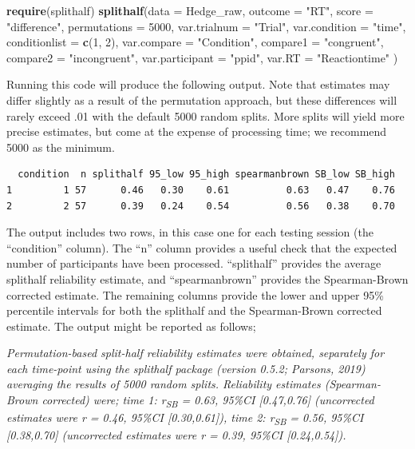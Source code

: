 \documentclass[english,,man,floatsintext]{apa6}
\newenvironment{Shaded}{\begin{snugshade}}{\end{snugshade}}
\newcommand{\DataTypeTok}[1]{\textcolor[rgb]{0.13,0.29,0.53}{#1}}
\newcommand{\DecValTok}[1]{\textcolor[rgb]{0.00,0.00,0.81}{#1}}
\newcommand{\KeywordTok}[1]{\textcolor[rgb]{0.13,0.29,0.53}{\textbf{#1}}}
\newcommand{\NormalTok}[1]{#1}
\newcommand{\StringTok}[1]{\textcolor[rgb]{0.31,0.60,0.02}{#1}}
\begin{document}
\begin{Shaded}
\begin{Highlighting}[]
\KeywordTok{require}\NormalTok{(splithalf)}
\KeywordTok{splithalf}\NormalTok{(}\DataTypeTok{data =}\NormalTok{ Hedge_raw,}
          \DataTypeTok{outcome =} \StringTok{"RT"}\NormalTok{,}
          \DataTypeTok{score =} \StringTok{"difference"}\NormalTok{,}
          \DataTypeTok{permutations =} \DecValTok{5000}\NormalTok{,}
          \DataTypeTok{var.trialnum =} \StringTok{"Trial"}\NormalTok{,}
          \DataTypeTok{var.condition =} \StringTok{"time"}\NormalTok{,}
          \DataTypeTok{conditionlist =} \KeywordTok{c}\NormalTok{(}\DecValTok{1}\NormalTok{, }\DecValTok{2}\NormalTok{),}
          \DataTypeTok{var.compare =} \StringTok{"Condition"}\NormalTok{,}
          \DataTypeTok{compare1 =} \StringTok{"congruent"}\NormalTok{,}
          \DataTypeTok{compare2 =} \StringTok{"incongruent"}\NormalTok{,}
          \DataTypeTok{var.participant =} \StringTok{"ppid"}\NormalTok{,}
          \DataTypeTok{var.RT =} \StringTok{"Reactiontime"}\NormalTok{ )}
\end{Highlighting}
\end{Shaded}

Running this code will produce the following output. Note that estimates may differ slightly as a result of the permutation approach, but these differences will rarely exceed .01 with the default 5000 random splits. More splits will yield more precise estimates, but come at the expense of processing time; we recommend 5000 as the minimum.

\begin{verbatim}
  condition  n splithalf 95_low 95_high spearmanbrown SB_low SB_high
1         1 57      0.46   0.30    0.61          0.63   0.47    0.76
2         2 57      0.39   0.24    0.54          0.56   0.38    0.70
\end{verbatim}

The output includes two rows, in this case one for each testing session (the \enquote{condition} column). The \enquote{n} column provides a useful check that the expected number of participants have been processed. \enquote{splithalf} provides the average splithalf reliability estimate, and \enquote{spearmanbrown} provides the Spearman-Brown corrected estimate. The remaining columns provide the lower and upper 95\% percentile intervals for both the splithalf and the Spearman-Brown corrected estimate. The output might be reported as follows;

\emph{Permutation-based split-half reliability estimates were obtained, separately for each time-point using the splithalf package (version 0.5.2; Parsons, 2019) averaging the results of 5000 random splits. Reliability estimates (Spearman-Brown corrected) were; time 1: r\textsubscript{SB} = 0.63, 95\%CI {[}0.47,0.76{]} (uncorrected estimates were r = 0.46, 95\%CI {[}0.30,0.61{]}), time 2: r\textsubscript{SB} = 0.56, 95\%CI {[}0.38,0.70{]} (uncorrected estimates were r = 0.39, 95\%CI {[}0.24,0.54{]}).}
\end{document}
